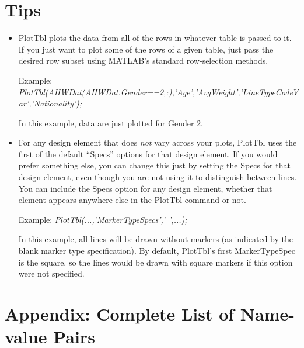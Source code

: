 \documentclass{article}
\newcommand{\example}[1]{Example: {\it #1}}
\begin{document}
\section{Tips}

\begin{itemize}

\item PlotTbl plots the data from all of the rows in whatever table
is passed to it.
If you just want to plot some of the rows of a given table, just pass
the desired row subset using MATLAB's standard row-selection methods.

\example{PlotTbl(AHWDat(AHWDat.Gender==2,:),'Age','AvgWeight','LineTypeCodeVar','Nationality');} 

In this example, data are just plotted for Gender 2.

\item For any design element that does \emph{not} vary across your plots,
PlotTbl uses the first of the default ``Specs'' options for that design element.
If you would prefer something else, you can change this just by setting the Specs
for that design element, even though you are not using it to distinguish between lines.
You can include the Specs option for any design element, whether that element appears
anywhere else in the PlotTbl command or not.

\example{PlotTbl(...,'MarkerTypeSpecs',' ',...);} 

In this example, all lines will be drawn without markers (as indicated by the blank marker type specification).
By default, PlotTbl's first MarkerTypeSpec is the square, so the lines would be drawn with square
markers if this option were not specified.

\end{itemize}

\appendix


\section{Appendix: Complete List of Name-value Pairs}
\end{document}
